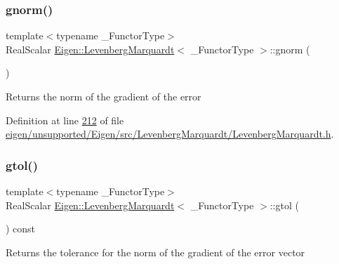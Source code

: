 \subsubsection{\texorpdfstring{gnorm()}{gnorm()}\hspace{0.1cm}{\footnotesize\ttfamily [2/2]}}
{\footnotesize\ttfamily template$<$typename \+\_\+\+Functor\+Type$>$ \\
Real\+Scalar \hyperlink{class_eigen_1_1_levenberg_marquardt}{Eigen\+::\+Levenberg\+Marquardt}$<$ \+\_\+\+Functor\+Type $>$\+::gnorm (\begin{DoxyParamCaption}{ }\end{DoxyParamCaption})\hspace{0.3cm}{\ttfamily [inline]}}

\begin{DoxyReturn}{Returns}
the norm of the gradient of the error 
\end{DoxyReturn}


Definition at line \hyperlink{eigen_2unsupported_2_eigen_2src_2_levenberg_marquardt_2_levenberg_marquardt_8h_source_l00212}{212} of file \hyperlink{eigen_2unsupported_2_eigen_2src_2_levenberg_marquardt_2_levenberg_marquardt_8h_source}{eigen/unsupported/\+Eigen/src/\+Levenberg\+Marquardt/\+Levenberg\+Marquardt.\+h}.

\mbox{\label{class_eigen_1_1_levenberg_marquardt_a18597c537ec7d492ee6d43788178e458}} 
\subsubsection{\texorpdfstring{gtol()}{gtol()}\hspace{0.1cm}{\footnotesize\ttfamily [1/2]}}
{\footnotesize\ttfamily template$<$typename \+\_\+\+Functor\+Type$>$ \\
Real\+Scalar \hyperlink{class_eigen_1_1_levenberg_marquardt}{Eigen\+::\+Levenberg\+Marquardt}$<$ \+\_\+\+Functor\+Type $>$\+::gtol (\begin{DoxyParamCaption}{ }\end{DoxyParamCaption}) const\hspace{0.3cm}{\ttfamily [inline]}}

\begin{DoxyReturn}{Returns}
the tolerance for the norm of the gradient of the error vector 
\end{DoxyReturn}


